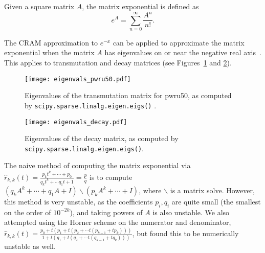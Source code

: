 Given a square matrix $A$, the matrix exponential is defined
as~\cite{ationneeded}
\begin{equation}
  e^{A} = \sum_{n=0}^\infty \frac{A^n}{n!}.
\end{equation}

The CRAM approximation to $e^{-x}$ can be applied to approximate the matrix
exponential when the matrix $A$ has eigenvalues on or near the negative real
axis~\cite{pusa2010computing}. This applies to transmutation and decay
matrices (see Figures~\ref{fig:eigenvals-pwru50} and \ref{fig:eigenvals-decay}).

\begin{figure}[!ht]
\centering
\texttt{[image: eigenvals\_pwru50.pdf]}
\caption{Eigenvalues of the transmutation matrix for pwru50, as computed by
  \texttt{scipy.\allowbreak{}sparse.\allowbreak{}linalg.\allowbreak{}eigen.\allowbreak{}eigs()}
  .}
\label{fig:eigenvals-pwru50}
\end{figure}

\begin{figure}[!ht]
\centering
\texttt{[image: eigenvals\_decay.pdf]}
\caption{Eigenvalues of the decay matrix, as computed by
  \texttt{scipy.\allowbreak{}sparse.\allowbreak{}linalg.\allowbreak{}eigen.\allowbreak{}eigs()}.}
\label{fig:eigenvals-decay}
\end{figure}


The naive method of computing the matrix exponential via $\hat{r}_{k,
k}(t)=\frac{p_kt^k + \cdots + p_0}{q_kt^k + \cdots q_1t + 1}=\frac{p}{q}$
is to compute $(q_kA^k + \cdots + q_1A + I)\backslash(p_kA^k + \cdots + I)$, where
$\backslash$ is a matrix solve. However, this method is very unstable, as the
coefficients $p_i,q_i$ are quite small (the smallest on the order of
$10^{-2k}$), and taking powers of $A$ is also unstable. We also attempted
using the Horner scheme on the numerator and denominator, $\hat{r}_{k,
  k}(t)=\frac{p_0 + t(p_1 + t(p_2 + \cdots t(p_{k-1} + tp_k)))}{1 + t(q_1 +
  t(q_2 + \cdots t(q_{k-1} + tq_k)))}$, but found this to be numerically
unstable as well.

